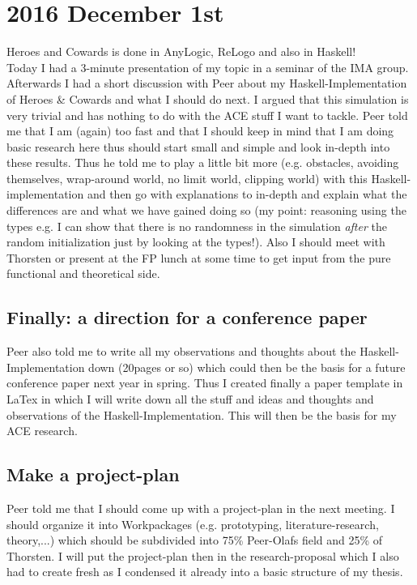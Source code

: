 \section*{2016 December 1st}
Heroes and Cowards is done in AnyLogic, ReLogo and also in Haskell! \\
Today I had a 3-minute presentation of my topic in a seminar of the IMA group. Afterwards I had a short discussion with Peer about my Haskell-Implementation of Heroes \& Cowards and what I should do next. I argued that this simulation is very trivial and has nothing to do with the ACE stuff I want to tackle. Peer told me that I am (again) too fast and that I should keep in mind that I am doing basic research here thus should start small and simple and look in-depth into these results. Thus he told me to play a little bit more (e.g. obstacles, avoiding themselves, wrap-around world, no limit world, clipping world) with this Haskell-implementation and then go with explanations to in-depth and explain what the differences are and what we have gained doing so (my point: reasoning using the types e.g. I can show that there is no randomness in the simulation \textit{after} the random initialization just by looking at the types!). Also I should meet with Thorsten or present at the FP lunch at some time to get input from the pure functional and theoretical side.

\subsection*{Finally: a direction for a conference paper}
Peer also told me to write all my observations and thoughts about the Haskell-Implementation down (20pages or so) which could then be the basis for a future conference paper next year in spring. Thus I created finally a paper template in LaTex in which I will write down all the stuff and ideas and thoughts and observations of the Haskell-Implementation. This will then be the basis for my ACE research.

\subsection*{Make a project-plan}
Peer told me that I should come up with a project-plan in the next meeting. I should organize it into Workpackages (e.g. prototyping, literature-research, theory,...) which should be subdivided into 75\% Peer-Olafs field and 25\% of Thorsten. I will put the project-plan then in the research-proposal which I also had to create fresh as I condensed it already into a basic structure of my thesis.